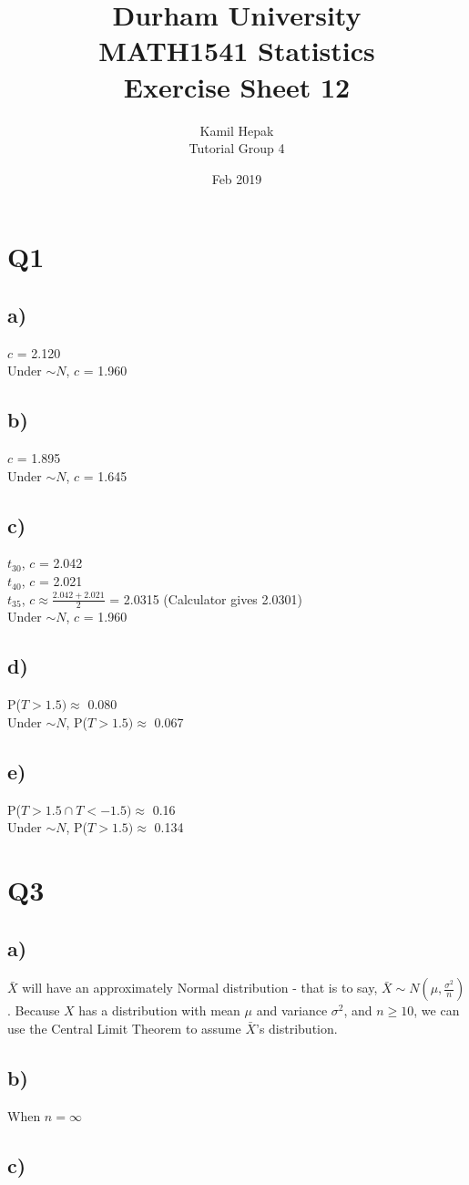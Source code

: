 \documentclass[]{article}
\title{\vspace{-3.0cm}Durham University\\
    MATH1541 Statistics \\
	Exercise Sheet 12}
\author{Kamil Hepak\\
        Tutorial Group 4}
\date{Feb 2019}
\begin{document}
\maketitle

\section{Q1}
\subsection{a)}
$c$ = 2.120
\\
Under $\sim N$, $c$ = 1.960

\subsection{b)}
$c$ = 1.895
\\
Under $\sim N$, $c$ = 1.645

\subsection{c)}
$t_{30}$, $c$ = 2.042 
\\
$t_{40}$, $c$ = 2.021 
\\
$t_{35}$, $c \approx \frac{2.042+2.021}{2}$ = 2.0315 (Calculator gives 2.0301)
\\
Under $\sim N$, $c$ = 1.960

\subsection{d)}
P($T > 1.5) \approx$ 0.080
\\
Under $\sim N$, P($T > 1.5) \approx$ 0.067

\subsection{e)}
P($T > 1.5 \cap T < -1.5) \approx$ 0.16
\\
Under $\sim N$, P($T > 1.5) \approx$ 0.134
\newpage

\section{Q3}

\subsection{a)}
$\bar{X}$ will have an approximately Normal distribution - that is to say, $\bar{X} \sim N(\mu,\frac{\sigma^2}{n})$. Because $X$ has a distribution with mean $\mu$ and variance $\sigma^2$, and $n \geq 10$, we can use the Central Limit Theorem to assume $\bar{X}$'s distribution.

\subsection{b)}

When $n = \infty$


\subsection{c)}
\end{document}
